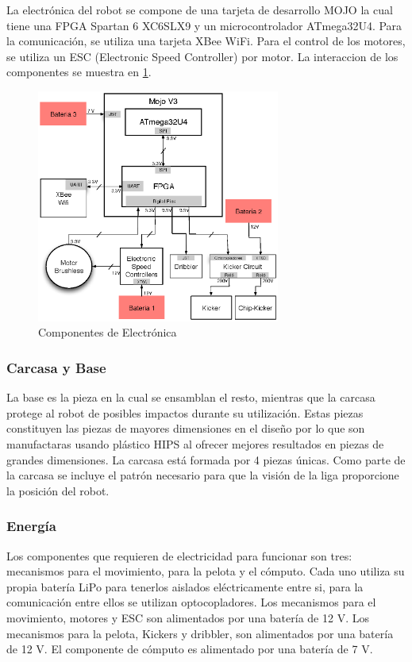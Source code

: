 \documentclass[twocolumn,10pt]{amrob}
\begin{document}
La electrónica del robot se compone de una tarjeta de desarrollo MOJO la cual tiene una FPGA Spartan 6 XC6SLX9 y un microcontrolador ATmega32U4. Para la comunicaci\'on, se utiliza una tarjeta XBee WiFi. Para el control de los motores, se utiliza un ESC (Electronic Speed Controller) por motor. La interaccion de los componentes se muestra en \ref{fig:electGral}. \par
\begin{figure}
  \centering
    \includegraphics[width=8cm]{diagElectronica.eps}
  \caption{Componentes de Electrónica}
  \label{fig:electGral}
\end{figure}
\subsubsection*{Carcasa y Base}
La base es la pieza en la cual se ensamblan el resto, mientras que la carcasa protege al robot de posibles impactos durante su utilización. Estas piezas constituyen las piezas de mayores dimensiones en el dise\~no por lo que son manufactaras usando plástico HIPS al ofrecer mejores resultados en piezas de grandes dimensiones. La carcasa est\'a formada por 4 piezas \'unicas. Como parte de la carcasa se incluye el patrón necesario para que la visi\'on de la liga proporcione la posici\'on del robot.\par
\subsubsection*{Energía}
Los componentes que requieren de electricidad para funcionar son tres: mecanismos para el movimiento, para la pelota y el cómputo. Cada uno utiliza su propia batería LiPo para tenerlos aislados eléctricamente entre si, para la comunicación entre ellos se utilizan optocopladores. Los mecanismos para el movimiento, motores y ESC son alimentados por una batería de 12 V. Los mecanismos para la pelota, Kickers y dribbler, son alimentados por una batería de 12 V. El componente de cómputo es alimentado por una batería de 7 V.
\end{document}
